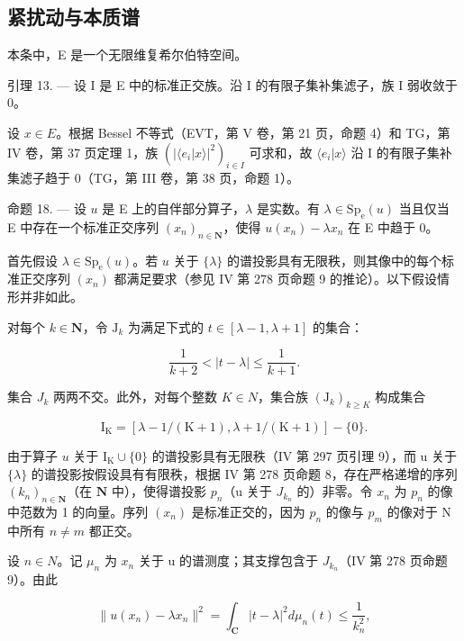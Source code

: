 \subsection{紧扰动与本质谱}

本条中，E 是一个无限维复希尔伯特空间。

引理 13. --- 设 I 是 E 中的标准正交族。沿 I 的有限子集补集滤子，族 I 弱收敛于 0。

设 \(x \in E\)。根据 Bessel 不等式（EVT，第 V 卷，第 21 页，命题 4）和 TG，第 IV 卷，第 37 页定理 1，族 \((|\langle e_{i} | x\rangle|^{2})_{i\in I}\) 可求和，故 \(\langle e_{i} | x\rangle\) 沿 I 的有限子集补集滤子趋于 0（TG，第 III 卷，第 38 页，命题 1）。

命题 18. --- 设 \(u\) 是 E 上的自伴部分算子，\(\lambda\) 是实数。有 \(\lambda \in \mathrm{Sp}_{\mathrm{e}}(u)\) 当且仅当 E 中存在一个标准正交序列 \((x_{n})_{n \in \mathbf{N}}\)，使得 \(u(x_{n}) - \lambda x_{n}\) 在 E 中趋于 0。

首先假设 \(\lambda \in \mathrm{Sp}_{\mathrm{e}}(u)\)。若 \(u\) 关于 \(\{\lambda\}\) 的谱投影具有无限秩，则其像中的每个标准正交序列 \((x_{n})\) 都满足要求（参见 IV 第 278 页命题 9 的推论）。以下假设情形并非如此。

对每个 \(k \in \mathbf{N}\)，令 \(\mathrm{J}_k\) 为满足下式的 \(t \in [\lambda - 1, \lambda + 1]\) 的集合：

\[
{\frac {1}{k + 2}} <   | t - \lambda | \leqslant {\frac {1}{k + 1}}.
\]

集合 \(J_{k}\) 两两不交。此外，对每个整数 \(K \in N\)，集合族 \((\mathrm{J}_{k})_{k \geqslant K}\) 构成集合

\[
\mathrm{I} _ {\mathrm{K}} = [ \lambda - 1 / (\mathrm{K} + 1), \lambda + 1 / (\mathrm{K} + 1) ] - \{0 \}.
\]

 由于算子 \(u\) 关于 \(\mathrm{I_K} \cup \{0\}\) 的谱投影具有无限秩（IV 第 297 页引理 9），而 u 关于 \(\{\lambda\}\) 的谱投影按假设具有有限秩，根据 IV 第 278 页命题 8，存在严格递增的序列 \((k_n)_{n \in \mathbf{N}}\)（在 \(\mathbf{N}\) 中），使得谱投影 \(p_{n}\)（u 关于 \(J_{k_{n}}\) 的）非零。令 \(x_{n}\) 为 \(p_{n}\) 的像中范数为 1 的向量。序列 \((x_{n})\) 是标准正交的，因为 \(p_{n}\) 的像与 \(p_{m}\) 的像对于 N 中所有 \(n \neq m\) 都正交。

设 \(n \in N\)。记 \(\mu_{n}\) 为 \(x_{n}\) 关于 u 的谱测度；其支撑包含于 \(J_{k_{n}}\)（IV 第 278 页命题 9）。由此

\[
\| u (x _ {n}) - \lambda x _ {n} \| ^ {2} = \int_ {\mathbf {C}} | t - \lambda | ^ {2} d \mu_ {n} (t) \leqslant \frac {1}{k _ {n} ^ {2}},
\]

